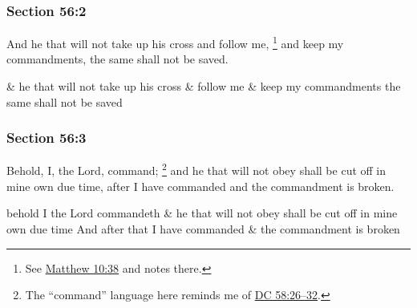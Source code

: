 
	\subsubsection{Section 56:2} %
		\label{DC56-2}

		And he that will not take up his cross and follow me,%
			\footnote{%
				See \hyperref[MATTHEW-10-38]{Matthew 10:38} and notes there.
				}
		and keep my commandments, the same shall not be saved.

		\begin{framed}
		\scriptsize
			\begin{compactdesc}
				\item[JSP] \& he that will not take up his cross \& follow me \& keep my commandments the same shall not be saved
			\end{compactdesc}
		\end{framed}

	\subsubsection{Section 56:3} %
		\label{DC56-3}

		Behold, I, the Lord, command;%
			\footnote{%
				The ``command'' language here reminds me of \hyperref[DC58-26]{DC 58:26--32}.
				}
		and he that will not obey shall be cut off in mine own due time, after I have commanded and the commandment is broken.

		\begin{framed}
		\scriptsize
			\begin{compactdesc}
				\item[JSP] behold I the Lord commandeth \& he that will not obey shall be cut off in mine own due time And after that I have commanded \& the commandment is broken
			\end{compactdesc}
		\end{framed}


